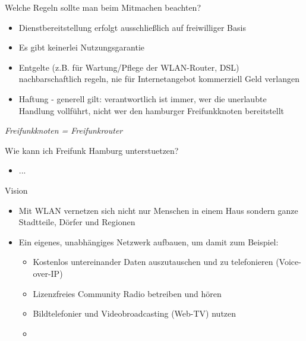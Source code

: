 \documentclass[aspectratio=43]{beamer}
\begin{document}
\begin{frame}{Welche Regeln sollte man beim Mitmachen beachten?}
	\begin{itemize}
		\item Dienstbereitstellung erfolgt ausschließlich auf freiwilliger Basis
		\item Es gibt keinerlei Nutzungsgarantie
		\item Entgelte (z.B. für Wartung/Pflege der WLAN-Router, DSL) nachbarschaftlich regeln, nie für Internetangebot kommerziell Geld verlangen
		\item Haftung - generell gilt: verantwortlich ist immer, wer die unerlaubte Handlung vollführt, nicht wer den hamburger Freifunkknoten bereitstellt
	\end{itemize}
	\it{Freifunkknoten = Freifunkrouter} %
\end{frame}

\begin{frame}{Wie kann ich Freifunk Hamburg unterstuetzen?}
	\begin{itemize}
		\item ...
	\end{itemize}
\end{frame}

\begin{frame}{Vision}
	\begin{itemize}
		\item Mit WLAN vernetzen sich nicht nur Menschen in einem Haus sondern ganze Stadtteile, Dörfer und Regionen %
		\item Ein eigenes, unabhängiges Netzwerk aufbauen, um damit zum Beispiel:
		\begin{itemize}
			\item Kostenlos untereinander Daten auszutauschen und zu telefonieren (Voice-over-IP)
			\item Lizenzfreies Community Radio betreiben und hören
			\item Bildtelefonier und Videobroadcasting (Web-TV) nutzen %
			\item <deine Idee hier> %
		\end{itemize}
	\end{itemize}
\end{frame}
\end{document}
